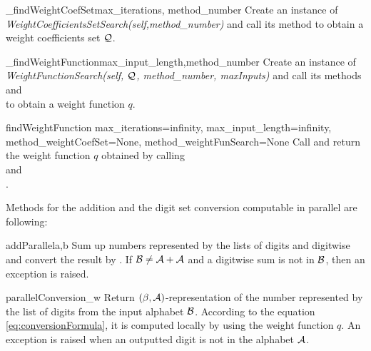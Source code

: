 \begin{method}{\_findWeightCoefSet}{max\_iterations, method\_number}
Create an instance of \emph{WeightCoefficientsSetSearch(self,method\_number)} and call its method  to obtain a weight coefficients set $\mathcal{Q}$.
\end{method}

\begin{method}{\_findWeightFunction}{max\_input\_length,method\_number}
Create an instance of \emph{WeightFunctionSearch(self, $\mathcal{Q}$, method\_number, maxInputs)} and call its methods  and \\  to obtain a weight function $q$.
\end{method}


\begin{method}{findWeightFunction}{ max\_iterations=infinity, max\_input\_length=infinity, \\ method\_weightCoefSet=None, method\_weightFunSearch=None}
Call  and return the weight function $q$ obtained by calling \\  and \\ .
\end{method}

%


Methods for the addition and the digit set conversion computable in parallel are following:

\begin{method}{addParallel}{a,b}
Sum up numbers represented by the lists of digits  and  digitwise and convert the result by . If $\mathcal{B}\neq\mathcal{A}+\mathcal{A}$ and a digitwise sum is not in $\mathcal{B}$, then an exception is raised.
\end{method}


\begin{method}{parallelConversion}{\_w}
Return $(\beta,\mathcal{A})$-representation of the number represented by the list  of digits from the input alphabet $\mathcal{B}$. According to the equation \eqref{eq:conversionFormula}, it is computed locally by using the weight function $q$. An exception is raised when an outputted digit is not in the alphabet $\mathcal{A}$.
\end{method}


